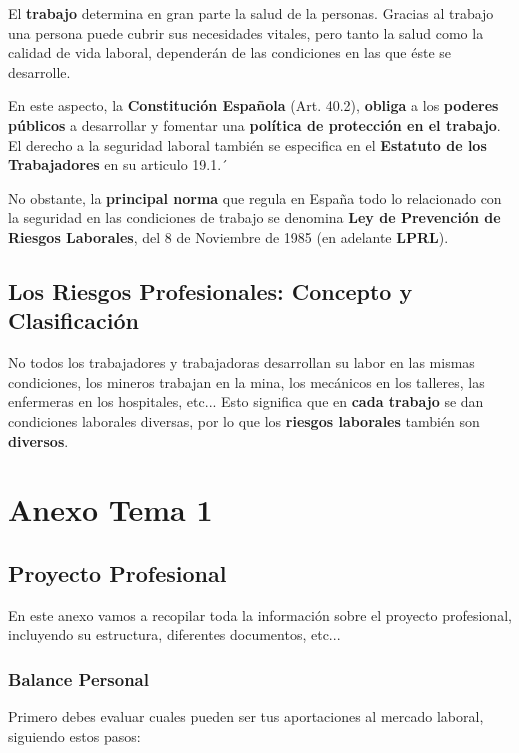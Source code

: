 El \textbf{trabajo} determina en gran parte la salud de la personas. Gracias al trabajo una persona puede cubrir sus necesidades vitales, pero tanto la salud como la calidad de vida laboral, dependerán de las condiciones en las que éste se desarrolle.

En este aspecto, la \textbf{Constitución Española} (Art. 40.2), \textbf{obliga} a los \textbf{poderes públicos} a desarrollar y fomentar una \textbf{política de protección en el trabajo}. El derecho a la seguridad laboral también se especifica en el \textbf{Estatuto de los Trabajadores} en su articulo 19.1.´

No obstante, la \textbf{principal norma} que regula en España todo lo relacionado con la seguridad  en las condiciones de trabajo se denomina \textbf{Ley de Prevención de Riesgos Laborales}, del 8 de Noviembre de 1985 (en adelante \textbf{LPRL}).

\section{Los Riesgos Profesionales: Concepto y Clasificación}
No todos los trabajadores y trabajadoras desarrollan su labor en las mismas condiciones, los mineros trabajan en la mina, los mecánicos en los talleres, las enfermeras en los hospitales, etc... Esto significa que en \textbf{cada trabajo} se dan condiciones laborales diversas, por lo que los \textbf{riesgos laborales} también son \textbf{diversos}.


\chapter{Anexo Tema 1}

\section{Proyecto Profesional}
En este anexo vamos a recopilar toda la información sobre el proyecto profesional, incluyendo su estructura, diferentes documentos, etc...

\subsection{Balance Personal}
Primero debes evaluar cuales pueden ser tus aportaciones al mercado laboral, siguiendo estos pasos:

